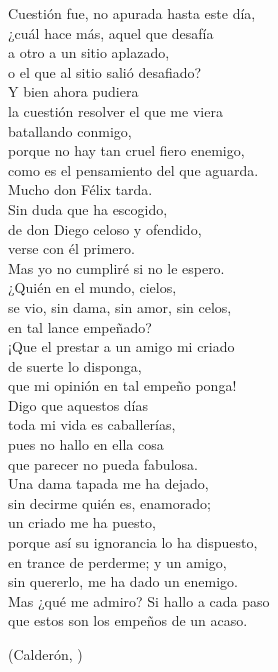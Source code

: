 \begin{exe}
	\ex\label{ex:silva}Cuestión fue, no apurada hasta este día,\\
	¿cuál hace más, aquel que desafía\\
	a otro a un sitio aplazado,\\
	o el que al sitio salió desafiado?\\
	Y bien ahora pudiera\\
	la cuestión resolver el que me viera\\
	batallando conmigo,\\
	porque no hay tan cruel fiero enemigo,\\
	como es el pensamiento del que aguarda.\\
	Mucho don Félix tarda.\\
	Sin duda que ha escogido,\\
	de don Diego celoso y ofendido,\\
	verse con él primero.\\
	Mas yo no cumpliré si no le espero.\\
	¿Quién en el mundo, cielos,\\
	se vio, sin dama, sin amor, sin celos,\\
	en tal lance empeñado?\\
	¡Que el prestar a un amigo mi criado\\
	de suerte lo disponga,\\
	que mi opinión en tal empeño ponga!\\
	Digo que aquestos días\\
	toda mi vida es caballerías,\\
	pues no hallo en ella cosa\\
	que parecer no pueda fabulosa.\\
	Una dama tapada me ha dejado,\\
	sin decirme quién es, enamorado;\\
	un criado me ha puesto,\\
	porque así su ignorancia lo ha dispuesto,\\
	en trance de perderme; y un amigo,\\
	sin quererlo, me ha dado un enemigo.\\
	Mas ¿qué me admiro? Si hallo a cada paso\\
	que estos son los empeños de un acaso.\\	
	\strut\hfill(Calderón, )
\end{exe}

